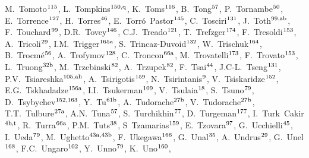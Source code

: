\begin{flushleft}
M.~Tomoto$^\textrm{\scriptsize 115}$,    
L.~Tompkins$^\textrm{\scriptsize 150,q}$,    
K.~Toms$^\textrm{\scriptsize 116}$,    
B.~Tong$^\textrm{\scriptsize 57}$,    
P.~Tornambe$^\textrm{\scriptsize 50}$,    
E.~Torrence$^\textrm{\scriptsize 127}$,    
H.~Torres$^\textrm{\scriptsize 46}$,    
E.~Torr\'o~Pastor$^\textrm{\scriptsize 145}$,    
C.~Tosciri$^\textrm{\scriptsize 131}$,    
J.~Toth$^\textrm{\scriptsize 99,ab}$,    
F.~Touchard$^\textrm{\scriptsize 99}$,    
D.R.~Tovey$^\textrm{\scriptsize 146}$,    
C.J.~Treado$^\textrm{\scriptsize 121}$,    
T.~Trefzger$^\textrm{\scriptsize 174}$,    
F.~Tresoldi$^\textrm{\scriptsize 153}$,    
A.~Tricoli$^\textrm{\scriptsize 29}$,    
I.M.~Trigger$^\textrm{\scriptsize 165a}$,    
S.~Trincaz-Duvoid$^\textrm{\scriptsize 132}$,    
W.~Trischuk$^\textrm{\scriptsize 164}$,    
B.~Trocm\'e$^\textrm{\scriptsize 56}$,    
A.~Trofymov$^\textrm{\scriptsize 128}$,    
C.~Troncon$^\textrm{\scriptsize 66a}$,    
M.~Trovatelli$^\textrm{\scriptsize 173}$,    
F.~Trovato$^\textrm{\scriptsize 153}$,    
L.~Truong$^\textrm{\scriptsize 32b}$,    
M.~Trzebinski$^\textrm{\scriptsize 82}$,    
A.~Trzupek$^\textrm{\scriptsize 82}$,    
F.~Tsai$^\textrm{\scriptsize 44}$,    
J.C-L.~Tseng$^\textrm{\scriptsize 131}$,    
P.V.~Tsiareshka$^\textrm{\scriptsize 105,ah}$,    
A.~Tsirigotis$^\textrm{\scriptsize 159}$,    
N.~Tsirintanis$^\textrm{\scriptsize 9}$,    
V.~Tsiskaridze$^\textrm{\scriptsize 152}$,    
E.G.~Tskhadadze$^\textrm{\scriptsize 156a}$,    
I.I.~Tsukerman$^\textrm{\scriptsize 109}$,    
V.~Tsulaia$^\textrm{\scriptsize 18}$,    
S.~Tsuno$^\textrm{\scriptsize 79}$,    
D.~Tsybychev$^\textrm{\scriptsize 152,163}$,    
Y.~Tu$^\textrm{\scriptsize 61b}$,    
A.~Tudorache$^\textrm{\scriptsize 27b}$,    
V.~Tudorache$^\textrm{\scriptsize 27b}$,    
T.T.~Tulbure$^\textrm{\scriptsize 27a}$,    
A.N.~Tuna$^\textrm{\scriptsize 57}$,    
S.~Turchikhin$^\textrm{\scriptsize 77}$,    
D.~Turgeman$^\textrm{\scriptsize 177}$,    
I.~Turk~Cakir$^\textrm{\scriptsize 4b,t}$,    
R.~Turra$^\textrm{\scriptsize 66a}$,    
P.M.~Tuts$^\textrm{\scriptsize 38}$,    
S~Tzamarias$^\textrm{\scriptsize 159}$,    
E.~Tzovara$^\textrm{\scriptsize 97}$,    
G.~Ucchielli$^\textrm{\scriptsize 45}$,    
I.~Ueda$^\textrm{\scriptsize 79}$,    
M.~Ughetto$^\textrm{\scriptsize 43a,43b}$,    
F.~Ukegawa$^\textrm{\scriptsize 166}$,    
G.~Unal$^\textrm{\scriptsize 35}$,    
A.~Undrus$^\textrm{\scriptsize 29}$,    
G.~Unel$^\textrm{\scriptsize 168}$,    
F.C.~Ungaro$^\textrm{\scriptsize 102}$,    
Y.~Unno$^\textrm{\scriptsize 79}$,    
K.~Uno$^\textrm{\scriptsize 160}$,    

\end{flushleft}
